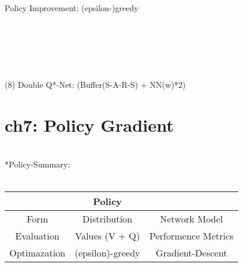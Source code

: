 \documentclass{article}
\begin{document}
~ \\[3pt]
Policy Improvement: (epsilon-)greedy 


~ \\[3pt]
~ \\[3pt]
~ \\[3pt]
~ \\[3pt]
~ \\[3pt]
(8) Double Q*-Net: \qquad (Buffer(S-A-R-S) + NN(w)*2) 


\newpage
\section*{ch7: Policy Gradient}


~ \\[3pt]
*Policy-Summary: \\[3pt]
~ \\[3pt]
\centering
\begin{tabular}{ccc}  %

    \toprule 
        & \qquad \qquad \qquad \qquad \qquad \qquad \qquad Policy & \\[3pt]
    \midrule 
        Form          & Distribution        & Network Model         \\[3pt]
        Evaluation    & Values (V + Q)      & Performence Metrics   \\[3pt]
        Optimazation  & (epsilon)-greedy    & Gradient-Descent      \\[3pt]
    \bottomrule 

\end{tabular}
\flushleft
\end{document}
